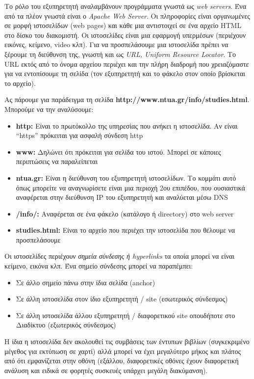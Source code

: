 Το ρόλο του εξυπηρετητή αναλαμβάνουν προγράμματα γνωστά ως \emph{web servers}. Ένα από τα πλέον γνωστά είναι ο \emph{Apache Web Server}. Οι πληροφορίες είναι οργανωμένες σε μορφή ιστοσελίδων (web pages) και κάθε μια αντιστοιχεί σε ένα αρχείο HTML στο δίσκο του διακομιστή. Οι ιστοσελίδες είναι μια εφαρμογή υπερμέσων (περιέχουν εικόνες, κείμενο, video κλπ). Για να προσπελάσουμε μια ιστοσελίδα πρέπει να ξέρουμε τη διεύθυνση της, γνωστή και ως \emph{URL, Uniform Resource Locator}. Το URL εκτός από το όνομα αρχείου περιέχει και την πλήρη διαδρομή που χρειαζόμαστε για να εντοπίσουμε τη σελίδα (τον εξυπηρετητή και το φάκελο στον οποίο βρίσκεται το αρχείο).

Ας πάρουμε για παράδειγμα τη σελίδα \textbf{http://www.ntua.gr/info/studies.html}. Μπορούμε να την αναλύσουμε:

\begin{itemize}
\item \textbf{http:} Είναι το πρωτόκολλο της υπηρεσίας που ανήκει η ιστοσελίδα. Αν είναι ``https'' πρόκειται για ασφαλή σύνδεση http
\item \textbf{www:} Δηλώνει ότι πρόκειται για σελίδα του ιστού. Μπορεί σε κάποιες περιπτώσεις να παραλείπεται
\item \textbf{ntua.gr:} Είναι η διεύθυνση του εξυπηρετητή ιστοσελίδων. Το κομμάτι αυτό όπως μπορείτε να αναγνωρίσετε είναι μια περιοχή 2ου επιπέδου, που ουσιαστικά αναφέρεται στην διεύθυνση IP του εξυπηρετητή και αναλύεται μέσω DNS
\item \textbf{/info/:} Αναφέρεται σε ένα φάκελο (κατάλογο ή directory) στο web server
\item \textbf{studies.html:} Είναι το αρχείο που περιέχει την ιστοσελίδα που θέλουμε να προσπελάσουμε
\end{itemize}

Οι ιστοσελίδες περιέχουν \emph{σημεία σύνδεσης ή hyperlinks} τα οποία μπορεί να είναι κείμενο, εικόνα κλπ. Ένα σημείο σύνδεσης μπορεί να παραπέμπει:

\begin{itemize}
\item Σε άλλο σημείο πάνω στην ίδια σελίδα (anchor)
\item Σε άλλη ιστοσελίδα στον ίδιο εξυπηρετητή / site (εσωτερικός σύνδεσμος)
\item Σε άλλη ιστοσελίδα άλλου εξυπηρετητή / διαφορετικού site οπουδήποτε στο Διαδίκτυο (εξωτερικός σύνδεσμος)
\end{itemize}

Η ίδια η ιστοσελίδα δεν ακολουθεί τις συμβάσεις των έντυπων βιβλίων (συγκεκριμένο μέγεθος για εκτύπωση σε χαρτί) αλλά μπορεί να έχει μεγαλύτερο μήκος και πλάτος από ότι εμφανίζεται στην οθόνη (εξάλλου, διαφορετικές οθόνες έχουν διαφορετική ανάλυση και ειδικά σε φορητές συσκευές υπάρχει μεγάλη διακύμανση).

